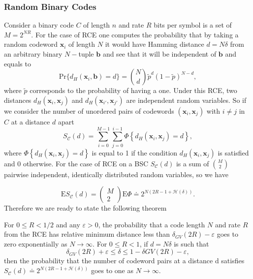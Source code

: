 \subsubsection{Random Binary Codes}
Consider a binary code $C$ of length $n$ and rate $R$ bits per symbol is a set of $M=2^{NR}$. For the case of RCE one computes the probability that by taking a random codeword $\mathbf{x}_i$ of length $N$ it would have Hamming distance $d=N\delta$ from an arbitrary binary $N-$tuple $\mathbf{b}$ and see that it will be independent of $\mathbf{b}$ and equals to
\begin{equation}
\text{Pr}\{d_H(\mathbf{x}_i,\mathbf{b})=d\}={N\choose d} \tilde{p}^d (1-\tilde{p})^{N-d},
\end{equation}
where $\tilde{p}$ corresponds to the probability of having a one. Under this RCE, two distances $d_H(\mathbf{x}_i,\mathbf{x}_j)$ and $d_H(\mathbf{x}_{i'},\mathbf{x}_{j'})$ are independent random variables. So if we consider the number of unordered pairs of codewords $(\mathbf{x}_i,\mathbf{x}_j)$ with $i\neq j$ in $C$ at a distance $d$ apart
\begin{equation}
S_{\mathcal{C}}(d)=\sum_{i=0}^{M-1} \sum_{j=0}^{i-1} \Phi\left\{d_{H}\left(\boldsymbol{x}_{i}, \boldsymbol{x}_{j}\right)=d\right\},
\end{equation}
where $\Phi\left\{d_{H}\left(\boldsymbol{x}_{i}, \boldsymbol{x}_{j}\right)=d\right\}$ is equal to 1 if the condition $d_H(\mathbf{x}_i,\mathbf{x}_j)$ is satisfied and $0$ otherwise. For the case of RCE on a BSC $S_{\mathcal{C}}(d)$ is a sum of ${M\choose 2}$ pairwise independent, identically distributed random variables, so we have

\begin{equation}
\mathrm{E} S_{\mathcal{C}}(d)=\left(\begin{array}{c}
M \\
2
\end{array}\right) \mathrm{E} \Phi \doteq 2^{N(2 R-1+\mathcal{H}(\delta))}.
\end{equation}
\indent Therefore we are ready to state the following theorem
\begin{theorem}
For $0\leq R< 1/2$ and any $\varepsilon>0$, the probability that a code length $N$ and rate $R$ from the RCE has relative minimum distance less than $\delta_{GV}(2R)-\varepsilon$ goes to zero exponentially as $N\to \infty$. For $0\leq R < 1$, if $d=N\delta$ is such that
\begin{equation}
\delta_{GV}(2R)+\varepsilon \leq \delta \leq 1- \delta{GV}(2R) - \varepsilon,
\end{equation}
then the probability that the number of codeword pairs at a distance d satisfies $S_{\mathcal{C}}(d) \doteq 2^{N(2 R-1+\mathcal{H}(\delta))}$ goes to one as $N\to \infty$.
\end{theorem}

